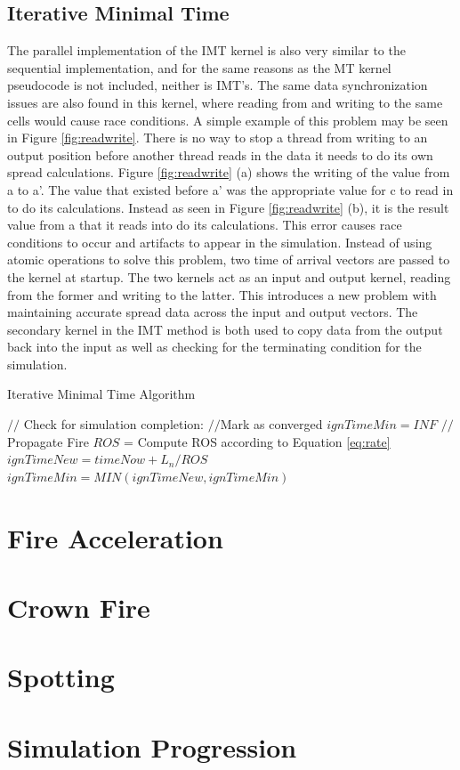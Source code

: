 \subsection{Iterative Minimal Time}
The parallel implementation of the IMT kernel is also very similar to the sequential implementation, and for the same reasons as the MT kernel pseudocode is not included, neither is IMT's. The same data synchronization issues are also found in this kernel, where reading from and writing to the same cells would cause race conditions. A simple example of this problem may be seen in Figure \ref{fig:readwrite}. There is no way to stop a thread from writing to an output position before another thread reads in the data it needs to do its own spread calculations. Figure \ref{fig:readwrite} (a) shows the writing of the value from a to a'. The value that existed before a' was the appropriate value for c to read in to do its calculations. Instead as seen in Figure \ref{fig:readwrite} (b), it is the result value from a that it reads into do its calculations. This error causes race conditions to occur and artifacts to appear in the simulation. Instead of using atomic operations to solve this problem, two time of arrival vectors are passed to the kernel at startup. The two kernels act as an input and output kernel, reading from the former and writing to the latter. This introduces a new problem with maintaining accurate spread data across the input and output vectors. The secondary kernel in the IMT method is both used to copy data from the output back into the input as well as checking for the terminating condition for the simulation. 

\begin{algorithm}[H]
  \caption{Iterative Minimal Time Algorithm}
  \label{alg:IMT}
  \begin{algorithmic}
  \STATE $//$ Check for simulation completion:
  \STATE $//$Mark as converged
  \ENDIF
  \STATE $ignTimeMin = INF$
  \STATE $//$Propagate Fire
  \STATE $ROS$ = Compute ROS according to Equation \ref{eq:rate}
  \STATE $ignTimeNew = timeNow + L_n / ROS$
  \STATE $ignTimeMin = MIN(ignTimeNew, ignTimeMin)$
  \ENDFOR
  \ENDIF
  \ENDFOR
  \end{algorithmic}
\end{algorithm}

\section{Fire Acceleration}

\section{Crown Fire}

\section{Spotting}

\section{Simulation Progression}